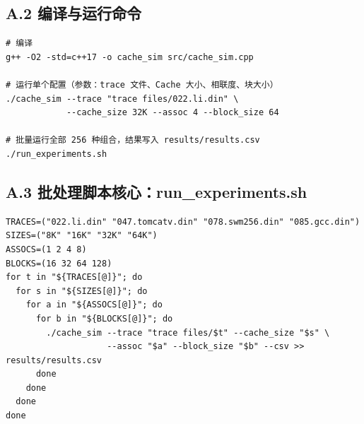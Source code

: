 \documentclass[12pt,a4paper]{ctexart}
\begin{document}
\subsection*{A.2 编译与运行命令}
\begin{verbatim}
# 编译
g++ -O2 -std=c++17 -o cache_sim src/cache_sim.cpp

# 运行单个配置（参数：trace 文件、Cache 大小、相联度、块大小）
./cache_sim --trace "trace files/022.li.din" \
            --cache_size 32K --assoc 4 --block_size 64

# 批量运行全部 256 种组合，结果写入 results/results.csv
./run_experiments.sh
\end{verbatim}

\subsection*{A.3 批处理脚本核心：run\_experiments.sh}
\begin{lstlisting}
TRACES=("022.li.din" "047.tomcatv.din" "078.swm256.din" "085.gcc.din")
SIZES=("8K" "16K" "32K" "64K")
ASSOCS=(1 2 4 8)
BLOCKS=(16 32 64 128)
for t in "${TRACES[@]}"; do
  for s in "${SIZES[@]}"; do
    for a in "${ASSOCS[@]}"; do
      for b in "${BLOCKS[@]}"; do
        ./cache_sim --trace "trace files/$t" --cache_size "$s" \
                    --assoc "$a" --block_size "$b" --csv >> results/results.csv
      done
    done
  done
done
\end{lstlisting}
\end{document}
